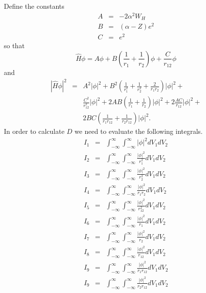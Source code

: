 \documentclass{article}
\numberwithin{equation}{section}
\begin{document}
Define the constants
\begin{eqnarray}
A &=& -2\alpha^2 W_H \label{s5e58} \\
B &=& (\alpha - Z) e^2 \label{s5e59} \\
C &=& e^2 \label{s5e60}
\end{eqnarray}
so that
\begin{equation}\label{s5e61}
\hat{H}\phi = A\phi + B\left(\frac{1}{r_1} + \frac{1}{r_2}\right)\phi +
\frac{C}{r_{12}}\phi
\end{equation}
and
\begin{eqnarray*}
|\hat{H}\phi|^2 &=& A^2|\phi|^2 + B^2\left(\frac{1}{r_1^2} + 
  \frac{1}{r_2^2} + \frac{2}{r_1r_2}\right)|\phi|^2 + \\
  & & \frac{C^2}{r_{12}^2}|\phi|^2 + 2AB\left(\frac{1}{r_1}+\frac{1}{r_2}
  \right)|\phi|^2 + 2\frac{AC}{r_{12}}|\phi|^2 + \\
  & & 2BC\left(\frac{1}{r_1r_{12}} + \frac{1}{r_2r_{12}}\right)|\phi|^2.
\end{eqnarray*}
In order to calculate $D$ we need to evaluate the following integrals.
\begin{eqnarray}
I_1 &=& \int_{-\infty}^\infty\int_{-\infty}^\infty |\phi|^2 dV_1 dV_2 
        \label{s5e62} \\
I_2 &=& \int_{-\infty}^\infty\int_{-\infty}^\infty\frac{|\phi|^2}{r_1^2}
        dV_1dV_2\label{s5e63}\\
I_3 &=& \int_{-\infty}^\infty\int_{-\infty}^\infty\frac{|\phi|^2}{r_2^2}
        dV_1dV_2\label{s5e64}\\
I_4 &=& \int_{-\infty}^\infty\int_{-\infty}^\infty\frac{|\phi|^2}{r_1r_2}
        dV_1dV_2\label{s5e65}\\
I_5 &=& \int_{-\infty}^\infty\int_{-\infty}^\infty\frac{|\phi|^2}{r_{12}^2}
        dV_1dV_2\label{s5e66}\\
I_6 &=& \int_{-\infty}^\infty\int_{-\infty}^\infty\frac{|\phi|^2}{r_1}
        dV_1dV_2\label{s5e67}\\
I_7 &=& \int_{-\infty}^\infty\int_{-\infty}^\infty\frac{|\phi|^2}{r_2}
        dV_1dV_2\label{s5e68}\\
I_8 &=& \int_{-\infty}^\infty\int_{-\infty}^\infty\frac{|\phi|^2}{r_{12}}
        dV_1dV_2\label{s5e69}\\
I_9 &=& \int_{-\infty}^\infty\int_{-\infty}^\infty\frac{|\phi|^2}
        {r_1r_{12}}dV_1dV_2 \label{s5e70}\\
I_9 &=& \int_{-\infty}^\infty\int_{-\infty}^\infty\frac{|\phi|^2}
        {r_2r_{12}}dV_1dV_2 \label{s5e71}
\end{eqnarray}
\end{document}
